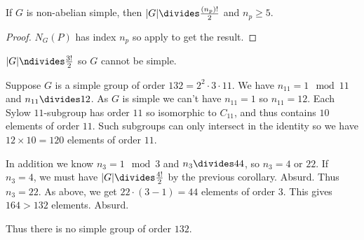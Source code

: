 \documentclass[a4paper]{article}
\theoremstyle{definition}
\begin{document}
\begin{corollary}
  If \(G\) is non-abelian simple, then \(|G| \divides \frac{(n_p)!}{2}\) and \(n_p \geq 5\).
\end{corollary}

\begin{proof}
  \(N_G(P)\) has index \(n_p\) so apply  to get the result.
\end{proof}

\begin{eg}[Continued]
  \(|G| \ndivides \frac{3!}{2}\) so \(G\) cannot be simple.
\end{eg}

\begin{eg}
  Suppose \(G\) is a simple group of order \(132 = 2^2 \cdot 3 \cdot 11\). We have \(n_{11} = 1 \mod 11\) and \(n_{11} \divides 12\). As \(G\) is simple we can't have \(n_{11} = 1\) so \(n_{11} = 12\). Each Sylow \(11\)-subgroup has order \(11\) so isomorphic to \(C_{11}\), and thus contains \(10\) elements of order \(11\). Such subgroups can only intersect in the identity so we have \(12 \times 10 = 120\) elements of order \(11\).

  In addition we know \(n_3 = 1 \mod 3\) and \(n_3 \divides 44\), so \(n_3 = 4\) or \(22\). If \(n_3 = 4\), we must have \(|G| \divides \frac{4!}{2}\) by the previous corollary. Absurd. Thus \(n_3 = 22\). As above, we get \(22 \cdot (3 - 1) = 44\) elements of order \(3\). This gives \(164 > 132\) elements. Absurd.

  Thus there is no simple group of order \(132\).
\end{eg}
\end{document}
